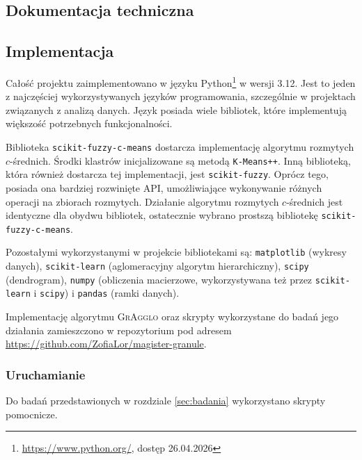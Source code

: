 \documentclass[a4paper,twoside,12pt]{book}
\newcommand{\procedura}[1]{\textsc{#1}}
\newcommand{\MojAlg}{\procedura{GrAgglo}}
\begin{document}
\backmatter

\cleardoublepage
{}
\printbibliography           %

\begin{appendices}

\chapter{Dokumentacja techniczna}

\section*{Implementacja}

Całość projektu zaimplementowano w języku Python\footnote{\url{https://www.python.org/}, dostęp 26.04.2026} w wersji 3.12. Jest to jeden z najczęściej wykorzystywanych języków programowania, szczególnie w projektach związanych z analizą danych. Język posiada wiele bibliotek, które implementują większość potrzebnych funkcjonalności.

Biblioteka \texttt{scikit-fuzzy-c-means} dostarcza implementację algorytmu rozmytych $c$-średnich. Środki klastrów inicjalizowane są metodą \texttt{K-Means++}.
Inną biblioteką, która również dostarcza tej implementacji, jest \texttt{scikit-fuzzy}. Oprócz tego, posiada ona bardziej rozwinięte API, umożliwiające wykonywanie różnych operacji na zbiorach rozmytych. Działanie algorytmu rozmytych $c$-średnich jest identyczne dla obydwu bibliotek, ostatecznie wybrano prostszą bibliotekę \texttt{scikit-fuzzy-c-means}.

Pozostałymi wykorzystanymi w projekcie bibliotekami są: \texttt{matplotlib} (wykresy danych), \texttt{scikit-learn} (aglomeracyjny algorytm hierarchiczny), \texttt{scipy} (dendrogram), \texttt{numpy} (obliczenia macierzowe, wykorzystywana też przez \texttt{scikit-learn} i \texttt{scipy}) i \texttt{pandas} (ramki danych).

Implementację algorytmu \MojAlg{} oraz skrypty wykorzystane do badań jego działania zamieszczono w repozytorium pod adresem \url{https://github.com/ZofiaLor/magister-granule}.

\subsection*{Uruchamianie}

Do badań przedstawionych w rozdziale \ref{sec:badania} wykorzystano skrypty pomocnicze. 


\end{appendices}
\end{document}
